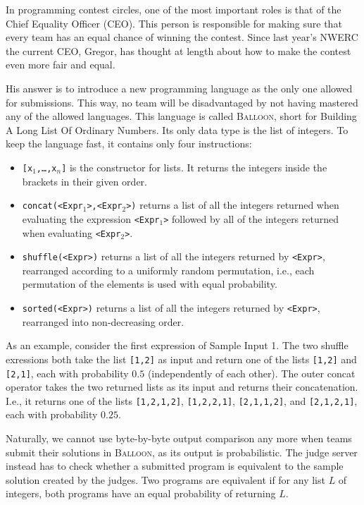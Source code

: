 
In programming contest circles, one of the most important roles is that of the Chief Equality Officer (CEO).
This person is responsible for making sure that every team has an equal chance of winning the contest.
Since last year's NWERC the current CEO, Gregor, has thought at length about how to make the contest even more fair and equal.

His answer is to introduce a new programming language as the only one allowed for submissions.
This way, no team will be disadvantaged by not having mastered any of the allowed languages.
This language is called \textsc{Balloon}, short for Building A Long List Of Ordinary Numbers.
Its only data type is the list of integers.
To keep the language fast, it contains only four instructions:
\begin{itemize}
	\item \texttt{[x$_1$,\ldots,x$_n$]} is the constructor for lists. It returns the integers inside the brackets in their given order.
	\item \texttt{concat(<Expr$_1$>,<Expr$_2$>)} returns a list of all the integers returned when evaluating the expression \texttt{<Expr$_1$>} followed by all of the integers returned when evaluating \texttt{<Expr$_2$>}.
  \item \texttt{shuffle(<Expr>)} returns a list of all the integers returned by \texttt{<Expr>}, rearranged according to a uniformly random permutation, i.e., each permutation of the elements is used with equal probability.
  \item \texttt{sorted(<Expr>)} returns a list of all the integers returned by \texttt{<Expr>}, rearranged into non-decreasing order.
\end{itemize}
As an example, consider the first expression of Sample Input 1.
The two shuffle exressions both take the list \texttt{[1,2]} as input and return one of the lists \texttt{[1,2]} and \texttt{[2,1]}, each with probability $0.5$ (independently of each other).
The outer concat operator takes the two returned lists as its input and returns their concatenation.
I.e., it returns one of the lists \texttt{[1,2,1,2]}, \texttt{[1,2,2,1]}, \texttt{[2,1,1,2]}, and \texttt{[2,1,2,1]}, each with probability $0.25$.

Naturally, we cannot use byte-by-byte output comparison any more when teams submit their solutions in \textsc{Balloon}, as its output is probabilistic.
The judge server instead has to check whether a submitted program is equivalent to the sample solution created by the judges.
Two programs are equivalent if for any list $L$ of integers, both programs have an equal probability of returning $L$.

